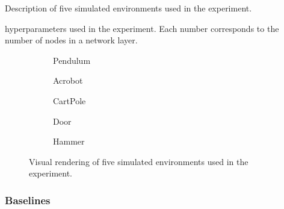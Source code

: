 \begin{landscape}
  \begin{table}[htbp!]
    \centering
    \caption{Description of five simulated environments used in the experiment.}
    \label{ch:DAIL:tab:Tasks}
    
  \end{table}

  \begin{table}[htbp!]
    \centering
    \caption{\DAIL{} hyperparameters used in the experiment. Each number corresponds to the number of nodes in a network layer.}
    \label{ch:DAIL:tab:ModelHyperparameteres}
    
  \end{table}
\end{landscape}

\begin{figure}[htbp!]
  \centering
  \begin{subfigure}[b]{0.25\textwidth}
    \centering
    \caption{Pendulum}
  \end{subfigure}
  \hfill
  \begin{subfigure}[b]{0.25\textwidth}
    \centering
    \caption{Acrobot}
  \end{subfigure}
  \hfill
  \begin{subfigure}[b]{0.25\textwidth}
    \centering
    \caption{CartPole}
  \end{subfigure}
  \par\bigskip
  \begin{subfigure}[b]{0.25\textwidth}
    \centering
    \caption{Door}
  \end{subfigure}
  \hspace{4em}
  \begin{subfigure}[b]{0.25\textwidth}
    \centering
    \caption{Hammer}
  \end{subfigure}
  \caption{Visual rendering of five simulated environments used in the experiment.}
  \label{ch:DAIL:fig:EnvVisualization}
\end{figure}



\subsubsection{Baselines}

